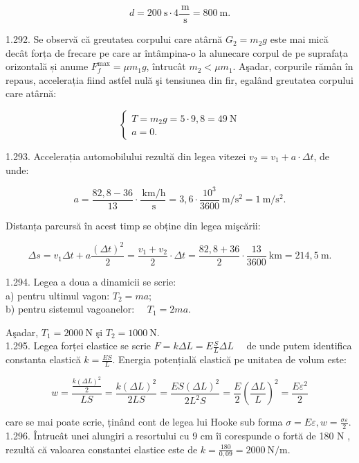 \documentclass[10pt]{article}
\begin{document}
$$
d=200 \mathrm{~s} \cdot 4 \frac{\mathrm{~m}}{\mathrm{~s}}=800 \mathrm{~m} .
$$

1.292. Se observă că greutatea corpului care atârnă $G_{2}=m_{2} g$ este mai mică decât forța de frecare pe care ar întâmpina-o la alunecare corpul de pe suprafața orizontală și anume $F_{f}^{\max }=\mu m_{1} g$, întrucât $m_{2}<\mu m_{1}$. Aşadar, corpurile rămân în repaus, accelerația fiind astfel nulă şi tensiunea din fir, egalând greutatea corpului care atârnă:

$$
\left\{\begin{array}{l}
T=m_{2} g=5 \cdot 9,8=49 \mathrm{~N} \\
a=0 .
\end{array}\right.
$$

1.293. Accelerația automobilului rezultă din legea vitezei $v_{2}=v_{1}+a \cdot \Delta t$, de unde:

$$
a=\frac{82,8-36}{13} \cdot \frac{\mathrm{~km} / \mathrm{h}}{\mathrm{~s}}=3,6 \cdot \frac{10^{3}}{3600} \mathrm{~m} / \mathrm{s}^{2}=1 \mathrm{~m} / \mathrm{s}^{2} .
$$

Distanța parcursă în acest timp se obține din legea mişcării:

$$
\Delta s=v_{1} \Delta t+a \frac{(\Delta t)^{2}}{2}=\frac{v_{1}+v_{2}}{2} \cdot \Delta t=\frac{82,8+36}{2} \cdot \frac{13}{3600} \mathrm{~km}=214,5 \mathrm{~m} .
$$

1.294. Legea a doua a dinamicii se scrie:\\
a) pentru ultimul vagon: $T_{2}=m a$;\\
b) pentru sistemul vagoanelor: $\quad T_{1}=2 m a$.

Aşadar, $T_{1}=2000 \mathrm{~N}$ şi $T_{2}=1000 \mathrm{~N}$.\\
1.295. Legea forței elastice se scrie $F=k \Delta L=E \frac{S}{L} \Delta L \quad$ de unde putem identifica constanta elastică $k=\frac{E S}{L}$. Energia potențială elastică pe unitatea de volum este:

$$
w=\frac{\frac{k(\Delta L)^{2}}{2}}{L S}=\frac{k(\Delta L)^{2}}{2 L S}=\frac{E S(\Delta L)^{2}}{2 L^{2} S}=\frac{E}{2}\left(\frac{\Delta L}{L}\right)^{2}=\frac{E \varepsilon^{2}}{2}
$$

care se mai poate scrie, ținând cont de legea lui Hooke sub forma $\sigma=E \varepsilon, w=\frac{\sigma \varepsilon}{2}$.\\
1.296. Întrucât unei alungiri a resortului cu 9 cm îi corespunde o fortă de 180 N , rezultă că valoarea constantei elastice este de $k=\frac{180}{0,09}=2000 \mathrm{~N} / \mathrm{m}$.
\end{document}

